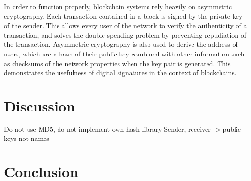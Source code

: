 \documentclass{article}
\begin{document}
\bigskip

In order to function properly, blockchain systems rely heavily on asymmetric cryptography. Each transaction contained in a block is signed by the private key of the sender. This allows every user of the network to verify the authenticity of a transaction, and solves the double spending problem by preventing repudiation of the transaction. Asymmetric cryptography is also used to derive the address of users, which are a hash of their public key combined with other information such as checksums of the network properties when the key pair is generated. This demonstrates the usefulness of digital signatures in the context of blockchains.


\section{Discussion}

Do not use MD5, do not implement own hash library
Sender, receiver -> public keys not names

\section{Conclusion}


\bigskip




\end{document}
